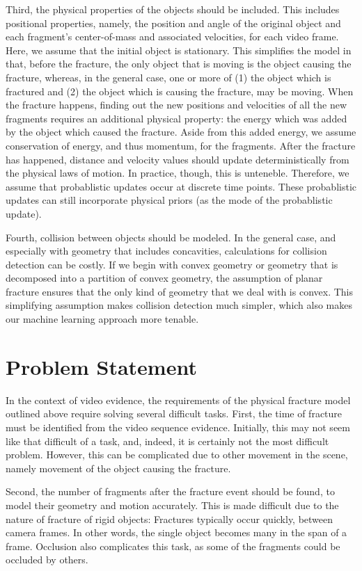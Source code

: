 \documentclass[10pt,twocolumn,letterpaper]{article}
\begin{document}
Third, the physical properties of the objects should be included. 
This includes positional properties, namely, the position and angle of the 
original object and each fragment's center-of-mass and associated velocities, 
for each video frame. Here, we assume that the initial object is 
stationary. This simplifies the model in that, before the fracture, the only 
object that is moving is the object causing the fracture, whereas, in the 
general case, one or more of (1) the object which is fractured and (2) the 
object which is causing the fracture, may be moving. When the fracture happens, 
finding out the new positions and velocities of all the new fragments requires 
an additional physical property: the energy which was added by the object which 
caused the fracture. Aside from this added energy, we assume conservation of 
energy, and thus momentum, for the fragments.
After the fracture has 
happened, distance and velocity values should update deterministically from 
the physical laws of motion. In practice, though, this is unteneble. Therefore, 
we assume that probablistic updates occur at discrete time points. These 
probablistic updates can still incorporate physical priors (as the 
mode of the probablistic update).

Fourth, collision between objects should be modeled. In the general case, and 
especially with geometry that includes concavities, calculations for collision 
detection can be costly. If we begin with convex geometry or geometry 
that is decomposed into a partition of convex geometry, the assumption of planar 
fracture ensures that the only kind of geometry that we deal with is convex. 
This simplifying assumption makes 
collision detection much simpler, which also makes our machine learning approach 
more tenable.

\section{Problem Statement}

In the context of video evidence, the requirements of the physical fracture 
model outlined above require solving several 
difficult tasks. First, the time of fracture must be identified from the video 
sequence evidence. Initially, this may not 
seem like that difficult of a task, and, indeed, it is certainly not the most 
difficult problem. However, this can be complicated due to other movement in the 
scene, namely movement of the object causing the fracture.

Second, the number of fragments after the fracture event should be found, 
to model their geometry and motion accurately. This is made 
difficult due to the nature of fracture of rigid objects: Fractures typically 
occur quickly, between camera frames. In other words, the single object becomes 
many in the span of a frame. Occlusion also complicates this task, as some of 
the fragments could be occluded by others.
\end{document}
